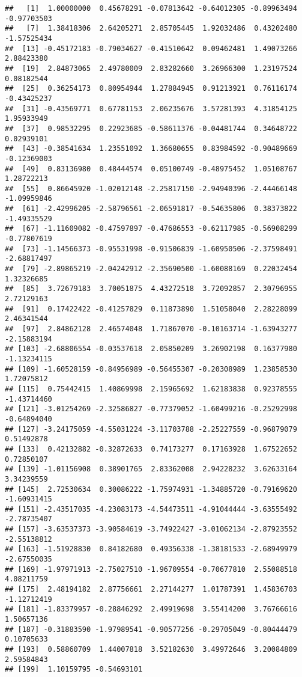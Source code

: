 \documentclass[
]{article}
\begin{document}
\begin{verbatim}
##   [1]  1.00000000  0.45678291 -0.07813642 -0.64012305 -0.89963494 -0.97703503
##   [7]  1.38418306  2.64205271  2.85705445  1.92032486  0.43202480 -1.57525434
##  [13] -0.45172183 -0.79034627 -0.41510642  0.09462481  1.49073266  2.88423380
##  [19]  2.84873065  2.49780009  2.83282660  3.26966300  1.23197524  0.08182544
##  [25]  0.36254173  0.80954944  1.27884945  0.91213921  0.76116174 -0.43425237
##  [31] -0.43569771  0.67781153  2.06235676  3.57281393  4.31854125  1.95933949
##  [37]  0.98532295  0.22923685 -0.58611376 -0.04481744  0.34648722  0.02939101
##  [43] -0.38541634  1.23551092  1.36680655  0.83984592 -0.90489669 -0.12369003
##  [49]  0.83136980  0.48444574  0.05100749 -0.48975452  1.05108767  1.28722213
##  [55]  0.86645920 -1.02012148 -2.25817150 -2.94940396 -2.44466148 -1.09959846
##  [61] -2.42996205 -2.58796561 -2.06591817 -0.54635806  0.38373822 -1.49335529
##  [67] -1.11609082 -0.47597897 -0.47686553 -0.62117985 -0.56908299 -0.77807619
##  [73] -1.14566373 -0.95531998 -0.91506839 -1.60950506 -2.37598491 -2.68817497
##  [79] -2.89865219 -2.04242912 -2.35690500 -1.60088169  0.22032454  1.32326685
##  [85]  3.72679183  3.70051875  4.43272518  3.72092857  2.30796955  2.72129163
##  [91]  0.17422422 -0.41257829  0.11873890  1.51058040  2.28228099  2.46341544
##  [97]  2.84862128  2.46574048  1.71867070 -0.10163714 -1.63943277 -2.15883194
## [103] -2.68806554 -0.03537618  2.05850209  3.26902198  0.16377980 -1.13234115
## [109] -1.60528159 -0.84956989 -0.56455307 -0.20308989  1.23858530  1.72075812
## [115]  0.75442415  1.40869998  2.15965692  1.62183838  0.92378555 -1.43714460
## [121] -3.01254269 -2.32586827 -0.77379052 -1.60499216 -0.25292998 -0.64894040
## [127] -3.24175059 -4.55031224 -3.11703788 -2.25227559 -0.96879079  0.51492878
## [133]  0.42132882 -0.32872633  0.74173277  0.17163928  1.67522652  0.72850107
## [139] -1.01156908  0.38901765  2.83362008  2.94228232  3.62633164  3.34239559
## [145]  2.72530634  0.30086222 -1.75974931 -1.34885720 -0.79169620 -1.60931415
## [151] -2.43517035 -4.23083173 -4.54473511 -4.91044444 -3.63555492 -2.78735407
## [157] -3.63537373 -3.90584619 -3.74922427 -3.01062134 -2.87923552 -2.55138812
## [163] -1.51928830  0.84182680  0.49356338 -1.38181533 -2.68949979 -2.67550035
## [169] -1.97971913 -2.75027510 -1.96709554 -0.70677810  2.55088518  4.08211759
## [175]  2.48194182  2.87756661  2.27144277  1.01787391  1.45836703 -1.12712419
## [181] -1.83379957 -0.28846292  2.49919698  3.55414200  3.76766616  1.50657136
## [187] -0.31883590 -1.97989541 -0.90577256 -0.29705049 -0.80444479  0.10705633
## [193]  0.58860709  1.44007818  3.52182630  3.49972646  3.20084809  2.59584843
## [199]  1.10159795 -0.54693101
\end{verbatim}
\end{document}
